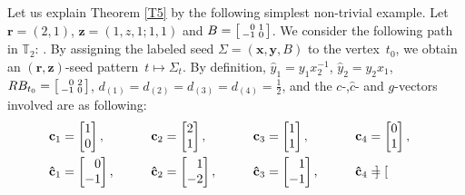 \documentclass[10pt,a4paper]{amsart}
\numberwithin{equation}{section}
\begin{document}
\begin{Example}
\label{EX1}
Let us explain Theorem \ref{T5} by the following simplest non-trivial example. Let~${\mathbf{r}=(2,1)}$, $\mathbf{z}=(1,z,1;1,1)$ and $B=\left[\begin{smallmatrix}
 \hphantom{-}0 & 1\\
 -1 & 0
 \end{smallmatrix}\right]$. We consider the following path in $\mathbb{T}_2$:
.
 By assigning the labeled seed $\Sigma=(\mathbf{x},\mathbf{y},B)$ to the vertex~$t_0$, we obtain an $(\mathbf{r},\mathbf{z})$-seed pattern~${t\mapsto \Sigma_t}$.
By definition, $\hat{y}_1=y_1x_2^{-1}$, $\hat{y}_2=y_2x_1$, $RB_{t_0}=\left[\begin{smallmatrix}
 \hphantom{-}0 & 2 \\
 -1 & 0
 \end{smallmatrix}\right]$, $d_{(1)}=d_{(2)}=d_{(3)}=d_{(4)}=\frac{1}{2}$, and the $c$-,$\hat{c}$- and $g$-vectors involved are as following:
 \begin{alignat*}{5}
 &\mathbf{c}_{1}=\begin{bmatrix}
 1\\0
 \end{bmatrix}, \qquad&&
 \mathbf{c}_{2}=\begin{bmatrix}
 2\\1
 \end{bmatrix},\qquad&&
 \mathbf{c}_{3}=\begin{bmatrix}
 1\\1
 \end{bmatrix},\qquad&&
 \mathbf{c}_{4}=\begin{bmatrix}
 0\\1
 \end{bmatrix},&\\
 &\mathbf{\hat{c}}_{1}=\begin{bmatrix}
 \hphantom{-}0\\-1
 \end{bmatrix},\qquad&&
 \mathbf{\hat{c}}_{2}=\begin{bmatrix}
 \hphantom{-}1\\-2
 \end{bmatrix},\qquad&&
 \mathbf{\hat{c}}_{3}=\begin{bmatrix}
 \hphantom{-}1\\-1
 \end{bmatrix},\qquad&&
 \mathbf{\hat{c}}_{4}=\begin{bmatrix}

\end{bmatrix}
\end{alignat*}
\end{Example}
\end{document}
